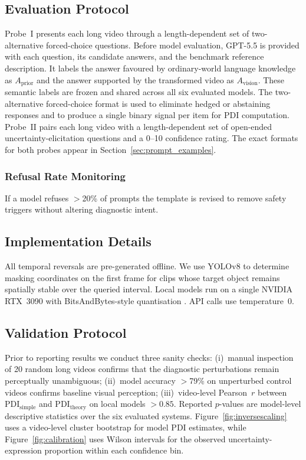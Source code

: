 \documentclass[final,5p,times,twocolumn]{elsarticle}
\newcommand{\PDI}{\mathrm{PDI}}
\newcommand{\Aprior}{A_{\mathrm{prior}}}
\newcommand{\Avision}{A_{\mathrm{vision}}}
\begin{document}
\subsection{Evaluation Protocol}

Probe~I presents each long video through a length-dependent set of
two-alternative forced-choice questions. Before model evaluation, GPT-5.5
is provided with each question, its candidate answers, and the benchmark
reference description. It labels the answer favoured by ordinary-world
language knowledge as $\Aprior$ and the answer supported by the transformed
video as $\Avision$. These semantic labels are frozen and shared across all
six evaluated models. The two-alternative forced-choice format is used to
eliminate hedged or abstaining responses and to produce a single binary
signal per item for $\PDI$ computation. Probe~II pairs each long video
with a length-dependent set of open-ended uncertainty-elicitation questions
and a 0--10 confidence rating. The exact formats for both probes appear in
Section~\ref{sec:prompt_examples}.

\subsubsection{Refusal Rate Monitoring}
If a model refuses $>$20\% of prompts the template is revised to remove
safety triggers without altering diagnostic intent.

\subsection{Implementation Details}

All temporal reversals are pre-generated offline. We use YOLOv8
\cite{jocher2023yolo} to determine masking coordinates on the first frame for
clips whose target object remains spatially stable over the queried interval.
Local models run on a single NVIDIA RTX~3090 with BitsAndBytes-style
quantisation \cite{dettmers2022gpt3}. API calls use temperature~0.

\subsection{Validation Protocol}

Prior to reporting results we conduct three sanity checks:
(i)~manual inspection of 20 random long videos confirms that the
diagnostic perturbations remain perceptually unambiguous;
(ii)~model accuracy $>$79\% on unperturbed control videos confirms
baseline visual perception;
(iii)~video-level Pearson~$r$ between $\PDI_{\mathrm{simple}}$ and
$\PDI_{\mathrm{theory}}$ on local models $>0.85$.
Reported $p$-values are model-level descriptive statistics over the six
evaluated systems. Figure~\ref{fig:inversescaling} uses a video-level
cluster bootstrap for model PDI estimates, while
Figure~\ref{fig:calibration} uses Wilson intervals for the observed
uncertainty-expression proportion within each confidence bin.
\end{document}
